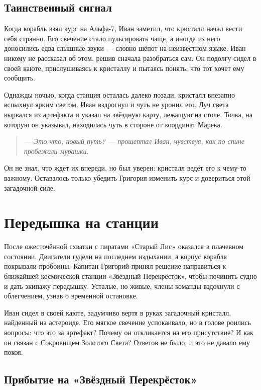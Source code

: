 \documentclass[12pt,a4paper]{book} %
\newenvironment{dialogue}{\begin{quote}\itshape}{\end{quote}}
\begin{document}
\section*{Таинственный сигнал}

Когда корабль взял курс на Альфа-7, Иван заметил, что кристалл начал вести себя странно. Его свечение стало пульсировать чаще, а иногда из него доносились едва слышные звуки --- словно шёпот на неизвестном языке. Иван никому не рассказал об этом, решив сначала разобраться сам. Он подолгу сидел в своей каюте, прислушиваясь к кристаллу и пытаясь понять, что тот хочет ему сообщить.

Однажды ночью, когда станция осталась далеко позади, кристалл внезапно вспыхнул ярким светом. Иван вздрогнул и чуть не уронил его. Луч света вырвался из артефакта и указал на звёздную карту, лежащую на столе. Точка, на которую он указывал, находилась чуть в стороне от координат Марека.

\begin{dialogue}
--- Это что, новый путь? --- прошептал Иван, чувствуя, как по спине пробежали мурашки.
\end{dialogue}

Он не знал, что ждёт их впереди, но был уверен: кристалл ведёт его к чему-то важному. Оставалось только убедить Григория изменить курс и довериться этой загадочной силе.

\chapter{Передышка на станции}

После ожесточённой схватки с пиратами «Старый Лис» оказался в плачевном состоянии. Двигатели гудели на последнем издыхании, а корпус корабля покрывали пробоины. Капитан Григорий принял решение направиться к ближайшей космической станции «Звёздный Перекрёсток», чтобы починить судно и дать экипажу передышку. Усталые, но живые, члены команды вздохнули с облегчением, узнав о временной остановке.

Иван сидел в своей каюте, задумчиво вертя в руках загадочный кристалл, найденный на астероиде. Его мягкое свечение успокаивало, но в голове роились вопросы: что это за артефакт? Почему он откликается на его присутствие? И как он связан с Сокровищем Золотого Света? Ответов не было, и это не давало ему покоя.

\section*{Прибытие на «Звёздный Перекрёсток»}
\end{document}
